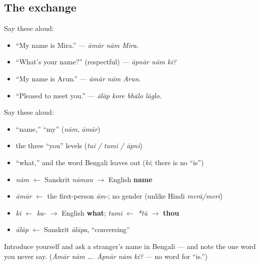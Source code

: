 \subsection*{The exchange}
Say these aloud:

\begin{itemize}
\raggedright
  \item \textquotedblleft{}My name is Mira.\textquotedblright{} — \emph{āmār nām Mira.}
  \item \textquotedblleft{}What's your name?\textquotedblright{} (respectful) — \emph{āpnār nām ki?}
  \item \textquotedblleft{}My name is Arun.\textquotedblright{} — \emph{āmār nām Arun.}
  \item \textquotedblleft{}Pleased to meet you.\textquotedblright{} — \emph{ālāp kore bhālo lāglo.}
\end{itemize}

\begin{cousinweb}
Say these aloud:

\begin{itemize}
\raggedright
  \item \textquotedblleft{}name,\textquotedblright{} \textquotedblleft{}my\textquotedblright{} (\emph{nām}, \emph{āmār})
  \item the three \textquotedblleft{}you\textquotedblright{} levels (\emph{tui / tumi / āpni})
  \item \textquotedblleft{}what,\textquotedblright{} and the word Bengali leaves out (\emph{ki}; there is no \textquotedblleft{}is\textquotedblright{})
\end{itemize}
\end{cousinweb}

\begin{grammarlens}[title={What you've built — roots you now carry}]
\begin{itemize}
\raggedright
  \item \emph{nām} $\leftarrow$ Sanskrit \emph{nāman} $\to$ English \textbf{name}
  \item \emph{āmār} $\leftarrow$ the first-person \emph{ām-}; no gender (unlike Hindi \emph{merā/merī})
  \item \emph{ki} $\leftarrow$ \emph{ka-} $\to$ English \textbf{what}; \emph{tumi} $\leftarrow$ \emph{*tū} $\to$ \textbf{thou}
  \item \emph{ālāp} $\leftarrow$ Sanskrit \emph{ālāpa}, \textquotedblleft{}conversing\textquotedblright{}
\end{itemize}
\end{grammarlens}

\begin{tcolorbox}[breakable,colback=teal!4,colframe=teal!35!black,title={Before you move on}]
Introduce yourself and ask a stranger's name in Bengali — and note the one word you never say. (\emph{Āmār nām …. Āpnār nām ki?} — no word for \textquotedblleft{}is.\textquotedblright{})
\end{tcolorbox}
